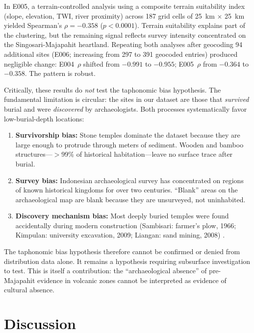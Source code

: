 \documentclass[12pt,a4paper]{article}
\begin{document}
In E005, a terrain-controlled analysis using a composite terrain suitability index (slope, elevation, TWI, river proximity) across 187 grid cells of 25~km $\times$ 25~km yielded Spearman's $\rho = -0.358$ ($p < 0.0001$). Terrain suitability explains part of the clustering, but the remaining signal reflects survey intensity concentrated on the Singosari-Majapahit heartland. Repeating both analyses after geocoding 94 additional sites (E006; increasing from 297 to 391 geocoded entries) produced negligible change: E004~$\rho$ shifted from $-0.991$ to $-0.955$; E005~$\rho$ from $-0.364$ to $-0.358$. The pattern is robust.

Critically, these results do \textit{not} test the taphonomic bias hypothesis. The fundamental limitation is circular: the sites in our dataset are those that \textit{survived} burial and were \textit{discovered} by archaeologists. Both processes systematically favor low-burial-depth locations:

\begin{enumerate}
  \item \textbf{Survivorship bias:} Stone temples dominate the dataset because they are large enough to protrude through meters of sediment. Wooden and bamboo structures---$>$99\% of historical habitation---leave no surface trace after burial.
  \item \textbf{Survey bias:} Indonesian archaeological survey has concentrated on regions of known historical kingdoms for over two centuries. ``Blank'' areas on the archaeological map are blank because they are unsurveyed, not uninhabited.
  \item \textbf{Discovery mechanism bias:} Most deeply buried temples were found accidentally during modern construction (Sambisari: farmer's plow, 1966; Kimpulan: university excavation, 2009; Liangan: sand mining, 2008) \citep{putra2019,abbas2016}.
\end{enumerate}

The taphonomic bias hypothesis therefore cannot be confirmed or denied from distribution data alone. It remains a hypothesis requiring subsurface investigation to test. This is itself a contribution: the ``archaeological absence'' of pre-Majapahit evidence in volcanic zones cannot be interpreted as evidence of cultural absence.

\section{Discussion}
\end{document}
